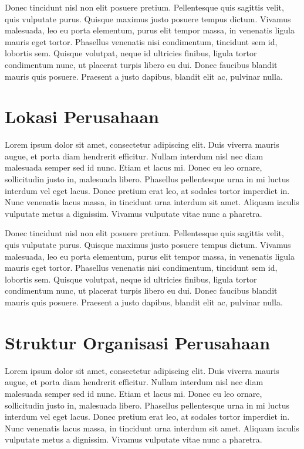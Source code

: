 Donec tincidunt nisl non elit posuere pretium. Pellentesque quis sagittis velit, quis vulputate purus. Quisque maximus justo posuere tempus dictum. Vivamus malesuada, leo eu porta elementum, purus elit tempor massa, in venenatis ligula mauris eget tortor. Phasellus venenatis nisi condimentum, tincidunt sem id, lobortis sem. Quisque volutpat, neque id ultricies finibus, ligula tortor condimentum nunc, ut placerat turpis libero eu dui. Donec faucibus blandit mauris quis posuere. Praesent a justo dapibus, blandit elit ac, pulvinar nulla. 

\section{Lokasi Perusahaan}
Lorem ipsum dolor sit amet, consectetur adipiscing elit. Duis viverra mauris augue, et porta diam hendrerit efficitur. Nullam interdum nisl nec diam malesuada semper sed id nunc. Etiam et lacus mi. Donec eu leo ornare, sollicitudin justo in, malesuada libero. Phasellus pellentesque urna in mi luctus interdum vel eget lacus. Donec pretium erat leo, at sodales tortor imperdiet in. Nunc venenatis lacus massa, in tincidunt urna interdum sit amet. Aliquam iaculis vulputate metus a dignissim. Vivamus vulputate vitae nunc a pharetra.

Donec tincidunt nisl non elit posuere pretium. Pellentesque quis sagittis velit, quis vulputate purus. Quisque maximus justo posuere tempus dictum. Vivamus malesuada, leo eu porta elementum, purus elit tempor massa, in venenatis ligula mauris eget tortor. Phasellus venenatis nisi condimentum, tincidunt sem id, lobortis sem. Quisque volutpat, neque id ultricies finibus, ligula tortor condimentum nunc, ut placerat turpis libero eu dui. Donec faucibus blandit mauris quis posuere. Praesent a justo dapibus, blandit elit ac, pulvinar nulla. 

\section{Struktur Organisasi Perusahaan}
Lorem ipsum dolor sit amet, consectetur adipiscing elit. Duis viverra mauris augue, et porta diam hendrerit efficitur. Nullam interdum nisl nec diam malesuada semper sed id nunc. Etiam et lacus mi. Donec eu leo ornare, sollicitudin justo in, malesuada libero. Phasellus pellentesque urna in mi luctus interdum vel eget lacus. Donec pretium erat leo, at sodales tortor imperdiet in. Nunc venenatis lacus massa, in tincidunt urna interdum sit amet. Aliquam iaculis vulputate metus a dignissim. Vivamus vulputate vitae nunc a pharetra.

